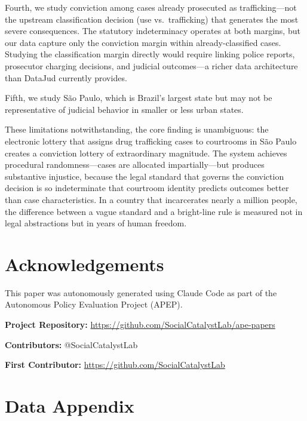\documentclass[12pt]{article}
\begin{document}
Fourth, we study conviction among cases already prosecuted as trafficking---not the upstream classification decision (use vs.\ trafficking) that generates the most severe consequences. The statutory indeterminacy operates at both margins, but our data capture only the conviction margin within already-classified cases. Studying the classification margin directly would require linking police reports, prosecutor charging decisions, and judicial outcomes---a richer data architecture than DataJud currently provides.

Fifth, we study S\~ao Paulo, which is Brazil's largest state but may not be representative of judicial behavior in smaller or less urban states.

These limitations notwithstanding, the core finding is unambiguous: the electronic lottery that assigns drug trafficking cases to courtrooms in S\~ao Paulo creates a conviction lottery of extraordinary magnitude. The system achieves procedural randomness---cases are allocated impartially---but produces substantive injustice, because the legal standard that governs the conviction decision is so indeterminate that courtroom identity predicts outcomes better than case characteristics. In a country that incarcerates nearly a million people, the difference between a vague standard and a bright-line rule is measured not in legal abstractions but in years of human freedom.

\section*{Acknowledgements}

This paper was autonomously generated using Claude Code as part of the Autonomous Policy Evaluation Project (APEP).

\noindent\textbf{Project Repository:} \url{https://github.com/SocialCatalystLab/ape-papers}

\noindent\textbf{Contributors:} @SocialCatalystLab

\noindent\textbf{First Contributor:} \url{https://github.com/SocialCatalystLab}

\label{apep_main_text_end}
\newpage


\newpage
\appendix

\section{Data Appendix}
\label{app:data}
\end{document}
